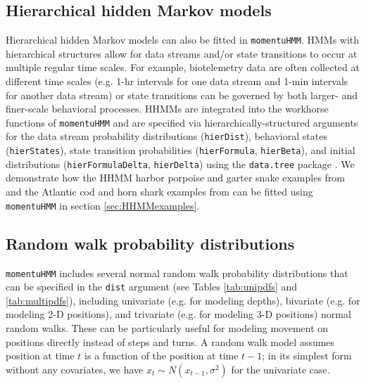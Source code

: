 \documentclass[12pt]{article}\usepackage[]{graphicx}\usepackage[]{color}
\begin{document}
\subsection{Hierarchical hidden Markov models}
\label{sec:HHMM}
Hierarchical hidden Markov models \citep[HHMMs; see][]{Leos-BarajasEtAl2017,AdamEtAl2019} can also be fitted in \verb|momentuHMM|. HMMs with hierarchical structures allow for data streams and/or state transitions to occur at multiple regular time scales. For example, biotelemetry data are often collected at different time scales (e.g. 1-hr intervals for one data stream and 1-min intervals for another data stream) or state transitions can be governed by both larger- and finer-scale behavioral processes. HHMMs are integrated into the workhorse functions of \verb|momentuHMM| and are specified via hierarchically-structured arguments for the data stream probability distributions (\verb|hierDist|), behavioral states (\verb|hierStates|), state transition probabilities (\verb|hierFormula|, \verb|hierBeta|), and initial distributions (\verb|hierFormulaDelta|, \verb|hierDelta|) using the \verb|data.tree| package \citep{Glur2018}. We demonstrate how the HHMM harbor porpoise and garter snake examples from \cite{Leos-BarajasEtAl2017} and the Atlantic cod and horn shark examples from \cite{AdamEtAl2019} can be fitted using \verb|momentuHMM| in section \ref{sec:HHMMexamples}.

\subsection{Random walk probability distributions}
\label{sec:rw}
\verb|momentuHMM| includes several normal random walk probability distributions that can be specified in the \verb|dist| argument (see Tables \ref{tab:unipdfs} and \ref{tab:multipdfs}), including univariate (e.g. for modeling depths), bivariate (e.g. for modeling 2-D positions), and trivariate (e.g. for modeling 3-D positions) normal random walks. These can be particularly useful for modeling movement on positions directly instead of steps and turns. A random walk model assumes position at time $t$ is a function of the position at time $t-1$; in its simplest form without any covariates, we have $x_t \sim N(x_{t-1},\sigma^2)$ for the univariate case. 
\end{document}
